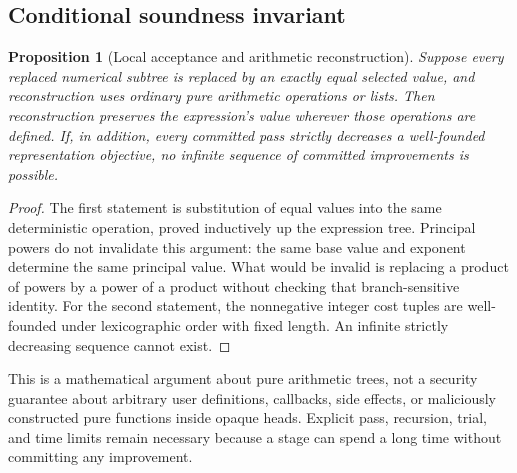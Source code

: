 \documentclass[11pt,letterpaper]{article}
\numberwithin{equation}{section}
\newtheorem{proposition}[theorem]{Proposition}
\theoremstyle{definition}\newtheorem{definition}[theorem]{Definition}
\theoremstyle{remark}\newtheorem{remark}[theorem]{Remark}
\begin{document}
\subsection{Conditional soundness invariant}
\begin{proposition}[Local acceptance and arithmetic reconstruction]
Suppose every replaced numerical subtree is replaced by an exactly equal selected value, and reconstruction uses ordinary pure arithmetic operations or lists. Then reconstruction preserves the expression's value wherever those operations are defined. If, in addition, every committed pass strictly decreases a well-founded representation objective, no infinite sequence of committed improvements is possible.
\end{proposition}
\begin{proof}
The first statement is substitution of equal values into the same deterministic operation, proved inductively up the expression tree. Principal powers do not invalidate this argument: the same base value and exponent determine the same principal value. What would be invalid is replacing a product of powers by a power of a product without checking that branch-sensitive identity. For the second statement, the nonnegative integer cost tuples are well-founded under lexicographic order with fixed length. An infinite strictly decreasing sequence cannot exist.
\end{proof}
This is a mathematical argument about pure arithmetic trees, not a security guarantee about arbitrary user definitions, callbacks, side effects, or maliciously constructed pure functions inside opaque heads. Explicit pass, recursion, trial, and time limits remain necessary because a stage can spend a long time without committing any improvement.
\end{document}
